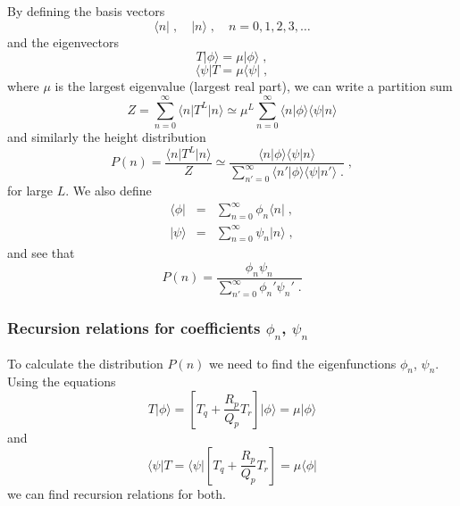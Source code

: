 \documentclass[a4paper,10pt]{article}
\newcommand{\bra}[1]{\langle #1 \vert}
\newcommand{\ket}[1]{\vert #1 \rangle}
\newcommand{\braket}[2]{\langle #1 \vert #2 \rangle}
\begin{document}
By defining the basis vectors
\begin{equation}
  \bra{n} \;, \quad \ket{n} \;, \quad n = 0,1,2,3,\ldots 
\end{equation}
and the eigenvectors
\begin{equation}
 T \ket{\phi} = \mu \ket{\phi}\;, 
\end{equation}
\begin{equation}
 \bra{\psi} T = \mu \bra{\psi} \;, 
\end{equation}
where $\mu$ is the largest eigenvalue (largest real part), we can write a partition sum 
\begin{equation}
  Z = \sum_{n=0}^\infty \bra{n} T^L \ket{n} \simeq  \mu^L \sum_{n=0}^\infty \braket{n}{\phi}\braket{\psi}{n}
\end{equation}
and similarly the height distribution
\begin{equation}
  P(n) = \frac{ \bra{n} T^L \ket{n} }{Z} \simeq \frac{ 
               \braket{n}{\phi}\braket{\psi}{n}
              }
              {
               \sum_{n'=0}^\infty \braket{n'}{\phi}\braket{\psi}{n'} \;. 
              }\;,
\end{equation}
for large $L$. We also define
\begin{eqnarray}
 \bra{\phi} &=& \sum_{n=0}^\infty \phi_n \bra{n} \;, \nonumber \\
 \ket{\psi} &=& \sum_{n=0}^\infty \psi_n \ket{n} \;,
\end{eqnarray}
and see that
\begin{equation}
  P(n) = \frac{ 
               \phi_n\psi_n
              }
              {
               \sum_{n'=0}^\infty \phi_n' \psi_n' \;. 
              }
\end{equation}



\subsubsection{Recursion relations for coefficients $\phi_n$, $\psi_n$}

To calculate the distribution $P(n)$ we need to find the eigenfunctions $\phi_n$, $\psi_n$. Using the equations
\begin{equation}
 T\ket{\phi} = \left[ T_q + \frac{R_p}{Q_p} T_r \right] \ket{\phi} = \mu \ket{\phi}
\end{equation}
and
\begin{equation}
 \bra{\psi}T = \bra{\psi}\left[ T_q + \frac{R_p}{Q_p} T_r \right]= \mu \bra{\phi}
\end{equation}
we can find recursion relations for both. 
\end{document}
